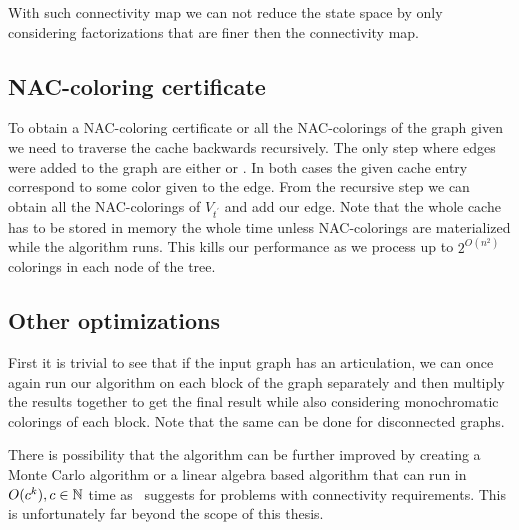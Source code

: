 With such connectivity map we can not reduce the state space by only considering
factorizations that are finer then the connectivity map.

\subsection{NAC-coloring certificate}

To obtain a NAC-coloring certificate or all the NAC-colorings of the graph
given we need to traverse the cache backwards recursively.
The only step where edges were added to the graph are either \IntroduceEdgeNode{}
or \IntroduceVertexWithEdgesNode{}. In both cases the given cache entry correspond
to some color given to the edge. From the recursive step we can obtain
all the NAC-colorings of \( V_{t^\prime} \) and add our edge.
Note that the whole cache has to be stored in memory the whole time unless
NAC-colorings are materialized while the algorithm runs.
This kills our performance as we process up to \( 2^{O(n^2)} \) colorings
in each node of the tree.

\subsection{Other optimizations}

First it is trivial to see that if the input graph has an articulation,
we can once again run our algorithm on each block of the graph separately
and then multiply the results together to get the final result
while also considering monochromatic colorings of each block.
Note that the same can be done for disconnected graphs.

There is possibility that the algorithm can be further improved by creating
a Monte Carlo algorithm or a linear algebra based algorithm that can run
in \( O(c^k), c \in \mathbb{N} \) time as~\cite{book_parametrized_algorithms} suggests
for problems with connectivity requirements.
This is unfortunately far beyond the scope of this thesis.



